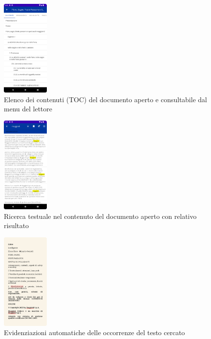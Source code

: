 \begin{multicols}{3}
            \begin{figure}[H]
                \includegraphics[width=0.21\textwidth]{img/toc.png}
                \caption{Elenco dei contenuti (TOC) del documento aperto e consultabile dal menu del lettore}
                \label{toc}
            \end{figure}
            
            \begin{figure}[H]
                \includegraphics[width=0.21\textwidth]{img/ricerca_testo.png}
                \caption{Ricerca testuale nel contenuto del documento aperto con relativo risultato}
                \label{ricerca_testo}
            \end{figure}
            
            \begin{figure}[H]
                \includegraphics[width=0.21\textwidth]{img/ricerca_testo2.png}
                \caption{Evidenziazioni automatiche delle occorrenze del testo cercato}
                \label{ricerca_testo2}
            \end{figure}
\end{multicols}

